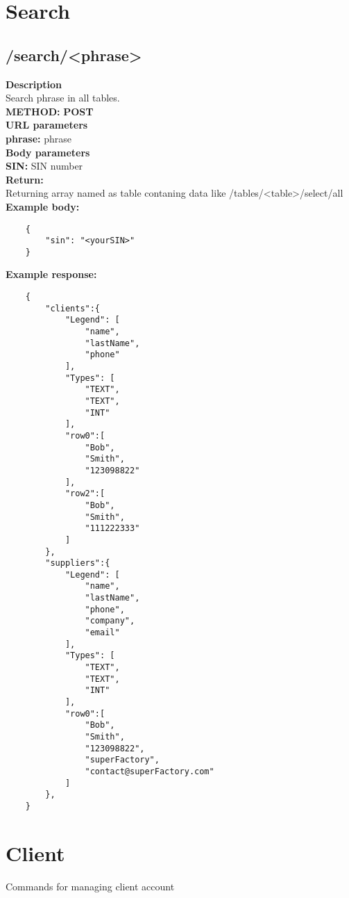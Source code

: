 \documentclass[a4paper, 12pt]{report}
\begin{document}
\section{Search}
\subsection{/search/<phrase>}
\textbf{\color{redText} Description} \\
Search phrase in all tables. \\
\textbf{\color{redText} METHOD: } \textbf{POST} \\
\textbf{\color{redText} URL parameters} \\
\textbf{phrase: } phrase\\
\textbf{\color{redText} Body parameters} \\
\textbf{SIN: } SIN number\\
\textbf{\color{redText} Return: } \\
Returning array named as table contaning data like /tables/<table>/select/all
\textbf{\color{redText} Example body: }
\begin{lstlisting}
    {
        "sin": "<yourSIN>"
    }
\end{lstlisting}
\textbf{\color{redText} Example response: }
\begin{lstlisting}
    {
        "clients":{
            "Legend": [
                "name",
                "lastName",
                "phone"
            ],
            "Types": [
                "TEXT",
                "TEXT",
                "INT"
            ],
            "row0":[
                "Bob",
                "Smith",
                "123098822"
            ],
            "row2":[
                "Bob",
                "Smith",
                "111222333"
            ]
        },
        "suppliers":{
            "Legend": [
                "name",
                "lastName",
                "phone",
                "company",
                "email"
            ],
            "Types": [
                "TEXT",
                "TEXT",
                "INT"
            ],
            "row0":[
                "Bob",
                "Smith",
                "123098822",
                "superFactory",
                "contact@superFactory.com"
            ]
        },
    }
\end{lstlisting}


\section{Client}
Commands for managing client account
\end{document}
